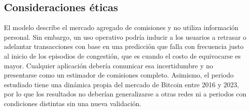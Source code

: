 \subsection{Consideraciones éticas}
El modelo describe el mercado agregado de comisiones y no utiliza información personal. Sin embargo, un uso operativo podría inducir a los usuarios a retrasar o adelantar transacciones con base en una predicción que falla con frecuencia justo al inicio de los episodios de congestión, que es cuando el costo de equivocarse es mayor. Cualquier aplicación debería comunicar esa incertidumbre y no presentarse como un estimador de comisiones completo. Asimismo, el periodo estudiado tiene una dinámica propia del mercado de Bitcoin entre 2016 y 2023, por lo que los resultados no deberían generalizarse a otras redes ni a periodos con condiciones distintas sin una nueva validación.
